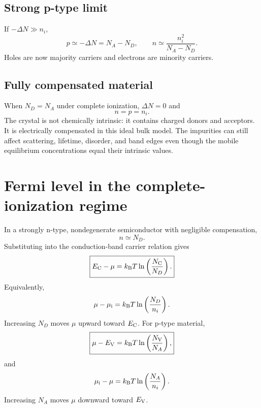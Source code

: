 \subsection{Strong p-type limit}

If $-\Delta N\gg n_i$,
\begin{equation}
  p\simeq-\Delta N=N_A-N_D,
  \qquad
  n\simeq\frac{n_i^2}{N_A-N_D}.
  \label{eq:p-type-majority-minority-limit}
\end{equation}
Holes are now majority carriers and electrons are minority carriers.

\subsection{Fully compensated material}

When $N_D=N_A$ under complete ionization, $\Delta N=0$ and
\begin{equation}
  n=p=n_i.
  \label{eq:full-compensation-intrinsic-populations}
\end{equation}
The crystal is not chemically intrinsic: it contains charged donors and
acceptors.  It is electrically compensated in this ideal bulk model.  The
impurities can still affect scattering, lifetime, disorder, and band edges even
though the mobile equilibrium concentrations equal their intrinsic values.

\section{Fermi level in the complete-ionization regime}

In a strongly n-type, nondegenerate semiconductor with negligible
compensation,
\begin{equation}
  n\simeq N_D.
  \label{eq:full-ionization-n-type-concentration}
\end{equation}
Substituting into the conduction-band carrier relation gives
\begin{equation}
  \boxed{
  E_{\mathrm C}-\mu
  =k_{\mathrm B} T\ln\left(\frac{N_{\mathrm C}}{N_D}\right).
  }
  \label{eq:n-type-fermi-level-from-donors}
\end{equation}
Equivalently,
\begin{equation}
  \mu-\mu_{\mathrm i}
  =k_{\mathrm B} T\ln\left(\frac{N_D}{n_i}\right).
  \label{eq:n-type-fermi-level-intrinsic-reference}
\end{equation}
Increasing $N_D$ moves $\mu$ upward toward $E_{\mathrm C}$.  For p-type material,
\begin{equation}
  \boxed{
  \mu-E_{\mathrm V}
  =k_{\mathrm B} T\ln\left(\frac{N_{\mathrm V}}{N_A}\right),
  }
  \label{eq:p-type-fermi-level-from-acceptors}
\end{equation}
and
\begin{equation}
  \mu_{\mathrm i}-\mu
  =k_{\mathrm B} T\ln\left(\frac{N_A}{n_i}\right).
  \label{eq:p-type-fermi-level-intrinsic-reference}
\end{equation}
Increasing $N_A$ moves $\mu$ downward toward $E_{\mathrm V}$.

